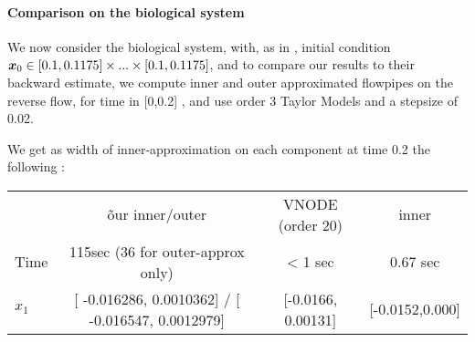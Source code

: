 

\paragraph{Comparison on the biological system}
We now consider the biological system, with, as in \cite{underapprox16}, initial condition $\x_0 \in [0.1,0.1175] \times...\times [0.1,0.1175]$, 
and to compare our results to their backward estimate, we compute inner and outer approximated flowpipes on the reverse flow, 
for time in [0,0.2] , and use order 3 Taylor Models and a stepsize of 0.02.

We get as width of inner-approximation on each component at time 0.2 the following :

\begin{tabular}{l|c|c|c}
 & õur inner/outer & VNODE (order 20) &  inner\cite{underapprox16} \\
Time & 115sec (36 for outer-approx only) & < 1 sec & 0.67 sec \\
$x_1$ &  [  -0.016286,   0.0010362] / [  -0.016547,   0.0012979] & [-0.0166, 0.00131] & [-0.0152,0.000] 

\end{tabular}

